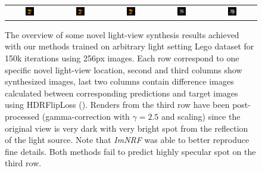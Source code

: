 \begin{figure}[!htb]
\begin{tabular*}{\textwidth}{ c c c c c }
          \includegraphics[width=0.2\textwidth]{figures/results/arb_set/validation/lego14_targ_256px.png}
        & \includegraphics[width=0.2\textwidth]{figures/results/arb_set/validation/lego14_imnrf_150k.png}
        & \includegraphics[width=0.2\textwidth]{figures/results/arb_set/validation/lego14_exva_150k.png}
        & \includegraphics[width=0.2\textwidth]{figures/results/arb_set/validation/lego14_imnrf_hdrflip_150k.png}
        & \includegraphics[width=0.2\textwidth]{figures/results/arb_set/validation/lego14_exva_hdrflip_150k.png}
        

    \end{tabular*}
    \caption{The overview of some novel light-view synthesis results
    achieved with our methods trained on arbitrary light setting Lego dataset
    for 150k iterations using 256px images.
    Each row correspond to one specific novel light-view location,
    second and third columns show synthesized images,
    last two columns contain difference images
    calculated between corresponding predictions and target images using HDRFlipLoss ().
    Renders from the third row have been post-processed (gamma-correction with $\gamma = 2.5$ and scaling)
    since the original view is very dark with very bright spot from the reflection of the light source.
    Note that \textit{ImNRF} was able to better reproduce fine details.
    Both methods fail to predict highly specular spot on the third row.
    }
    \label{tab:arb_selective_results}
\end{figure}
\endgroup